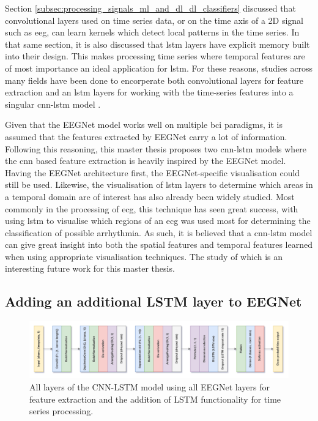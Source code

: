 Section \ref{subsec:processing_signals_ml_and_dl_dl_classifiers} discussed that convolutional layers used on time series data, or on the time axis of a 2D signal such as \gls{eeg}, can learn kernels which detect local patterns in the time series.
In that same section, it is also discussed that \gls{lstm} layers have explicit memory built into their design.
This makes processing time series where temporal features are of most importance an ideal application for \gls{lstm}.
For these reasons, studies across many fields have been done to encorperate both convolutional layers for feature extraction and an \gls{lstm} layers for working with the time-series features into a singular \gls{cnn}-\gls{lstm} model \citep{lstm_cnn_mi_eeg, cnn_bilstm_eeg_robot_arm}.

Given that the EEGNet model works well on multiple \gls{bci} paradigms, it is assumed that the features extracted by EEGNet carry a lot of information.
Following this reasoning, this master thesis proposes two \gls{cnn}-\gls{lstm} models where the \gls{cnn} based feature extraction is heavily inspired by the EEGNet model.
Having the EEGNet architecture first, the EEGNet-specific visualisation could still be used.
Likewise, the visualisation of \gls{lstm} layers to determine which areas in a temporal domain are of interest has also already been widely studied.
Most commonly in the processing of \gls{ecg}, this technique has seen great success, with \citet{lstm_visual_ecg} using \gls{lstm} to visualise which regions of an \gls{ecg} was used most for determining the classification of possible arrhythmia.
As such, it is believed that a \gls{cnn}-\gls{lstm} model can give great insight into both the spatial features and temporal features learned when using appropriate visualisation techniques.
The study of which is an interesting future work for this master thesis.


\subsection{Adding an additional LSTM layer to EEGNet}
\label{subsec:offline_bci_system_adding_memory_lstm_eegnet}

\begin{figure}[t]
    \centering
    \includegraphics[width=\linewidth]{../images/pipeline/eegnetlstm_full.pdf}
    \captionsetup{width=0.8\linewidth}
    \captionsetup{justification=centering}
    \caption{All layers of the CNN-LSTM model using all EEGNet layers for feature extraction and the addition of LSTM functionality for time series processing.}
    \label{fig:eegnetlstm_full}
\end{figure}

